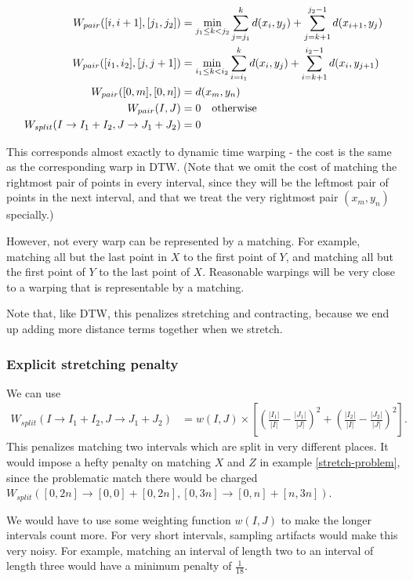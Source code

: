 \begin{align*}
W_{pair}([i,i+1], [j_1,j_2]) &= \min_{j_1 \le k < j_2} \sum_{j=j_1}^k d(x_i,y_j) + \sum_{j=k+1}^{j_2-1} d(x_{i+1},y_j)\\
W_{pair}([i_1,i_2], [j,j+1]) &= \min_{i_1 \le k < i_2} \sum_{i=i_1}^k d(x_i,y_j) + \sum_{i=k+1}^{i_2-1} d(x_i,y_{j+1})\\
W_{pair}([0,m], [0,n]) &= d(x_m,y_n)\\
W_{pair}(I, J) &= 0 \mbox{\quad otherwise}\\
W_{split}(I\to I_1 + I_2, J\to J_1 + J_2) &= 0
\end{align*}

This corresponds almost exactly to dynamic time warping - the cost is
the same as the corresponding warp in DTW. (Note that we omit the cost
of matching the rightmost pair of points in every interval, since they
will be the leftmost pair of points in the next interval, and that we
treat the very rightmost pair $(x_m,y_n)$ specially.)

However, not every warp can be represented by a matching. For example,
matching all but the last point in $X$ to the first point of $Y$, and
matching all but the first point of $Y$ to the last point of
$X$. Reasonable warpings will be very close to a warping that is
representable by a matching.

Note that, like DTW, this penalizes stretching and contracting,
because we end up adding more distance terms together when we stretch.

\subsubsection{Explicit stretching penalty}
We can use
\begin{align*}
W_{split}(I\to I_1 + I_2, J\to J_1 + J_2) &= w(I,J) \times \left[\left( \frac{|I_1|}{|I|} - \frac{|J_1|}{|J|}\right)^2 +
\left( \frac{|I_2|}{|I|} - \frac{|J_2|}{|J|}\right)^2 \right].
\end{align*}
This penalizes matching two intervals which are split in very
different places. It would impose a hefty penalty on matching $X$ and
$Z$ in example \ref{stretch-problem}, since the problematic match
there would be charged $W_{split}([0,2n]\to [0,0] + [0,2n], [0,3n] \to
[0,n] + [n,3n])$.

We would have to use some weighting function $w(I,J)$ to make the
longer intervals count more. For very short intervals, sampling
artifacts would make this very noisy. For example, matching an
interval of length two to an interval of length three would have a
minimum penalty of $\frac{1}{18}$.

